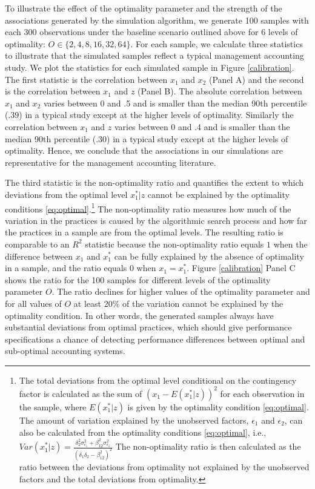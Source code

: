 \documentclass[12pt]{article}
\begin{document}
To illustrate the effect of the optimality parameter and the strength of the associations generated by the simulation algorithm, we generate 100 samples with each 300 observations under the baseline scenario outlined above for 6 levels of optimality: $O \in  \{2, 4, 8, 16, 32, 64\}$. For each sample, we calculate three statistics to illustrate that the simulated samples reflect a typical management accounting study. We plot the statistics for each simulated sample in Figure \ref{calibration}. The first statistic is the correlation between $x_1$ and $x_2$ (Panel A) and the second is the correlation between $x_1$ and $z$ (Panel B). The absolute correlation between $x_1$ and $x_2$ varies between 0 and .5 and is smaller than the median 90th percentile ($.39$) in a typical study except at the higher levels of optimality. Similarly the correlation between $x_1$ and $z$ varies between 0 and .4 and is smaller than the median 90th percentile (.30) in a typical study except at the higher levels of optimality. Hence, we conclude that the associations in our simulations are representative for the management accounting literature. 

The third statistic is the non-optimality ratio and quantifies the extent to which deviations from the optimal level $x^*_1|z$ cannot be explained by the optimality conditions \eqref{eq:optimal}.\footnote{The total deviations from the optimal level conditional on the contingency factor is calculated as the sum of $(x_1 - E(x_1^*|z))^2$ for each observation in the sample, where $E(x_1^*|z)$ is given by the optimality condition \eqref{eq:optimal}. The amount of variation explained by the unobserved factors, $\epsilon_1$ and $\epsilon_2$, can also be calculated from the optimality conditions \eqref{eq:optimal}, i.e., $Var(x_1^*|z) = \frac{\delta_2^2 \sigma_{\epsilon_1}^2 + \beta_{12}^2 \sigma_{\epsilon_1}^2}{(\delta_1 \delta_2 - \beta_{12}^2)^2}$
The non-optimality ratio is then calculated as the ratio between the deviations from optimality not explained by the unobserved factors and the total deviations from optimality.} The non-optimality ratio measures how much of the variation in the practices is caused by the algorithmic search process and how far the practices in a sample are from the optimal levels. The resulting ratio is comparable to an $R^2$ statistic because the non-optimality ratio equals $1$ when the difference between $x_1$ and $x^*_1$ can be fully explained by the absence of optimality in a sample, and the ratio equals $0$ when $x_1 = x^*_1$. Figure \ref{calibration} Panel C shows the ratio for the 100 samples for different levels of the optimality parameter $O$. The ratio declines for higher values of the optimality parameter and for all values of $O$ at least $20\%$ of the variation cannot be explained by the optimality condition. In other words, the generated samples always have substantial deviations from optimal practices, which should give performance specifications a chance of detecting performance differences between optimal and sub-optimal accounting systems. 
\end{document}
